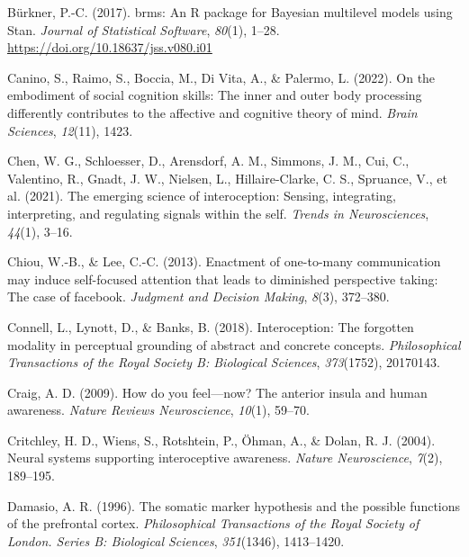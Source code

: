 \documentclass[
  man,mask,floatsintext]{apa6}
\newlength{\cslhangindent}
\newlength{\cslentryspacingunit} %
\newenvironment{CSLReferences}[2] %
 {%
  \setlength{\parindent}{0pt}
  \ifodd #1
  \let\oldpar\par
  \def\par{\hangindent=\cslhangindent\oldpar}
  \fi
  \setlength{\parskip}{#2\cslentryspacingunit}
 }%
 {}
\begin{document}
\begin{CSLReferences}{1}{0}
\leavevmode{}%
Bürkner, P.-C. (2017). {brms}: An {R} package for {Bayesian} multilevel models using {Stan}. \emph{Journal of Statistical Software}, \emph{80}(1), 1--28. \url{https://doi.org/10.18637/jss.v080.i01}

\leavevmode{}%
Canino, S., Raimo, S., Boccia, M., Di Vita, A., \& Palermo, L. (2022). On the embodiment of social cognition skills: The inner and outer body processing differently contributes to the affective and cognitive theory of mind. \emph{Brain Sciences}, \emph{12}(11), 1423.

\leavevmode{}%
Chen, W. G., Schloesser, D., Arensdorf, A. M., Simmons, J. M., Cui, C., Valentino, R., Gnadt, J. W., Nielsen, L., Hillaire-Clarke, C. S., Spruance, V., et al. (2021). The emerging science of interoception: Sensing, integrating, interpreting, and regulating signals within the self. \emph{Trends in Neurosciences}, \emph{44}(1), 3--16.

\leavevmode{}%
Chiou, W.-B., \& Lee, C.-C. (2013). Enactment of one-to-many communication may induce self-focused attention that leads to diminished perspective taking: The case of facebook. \emph{Judgment and Decision Making}, \emph{8}(3), 372--380.

\leavevmode{}%
Connell, L., Lynott, D., \& Banks, B. (2018). Interoception: The forgotten modality in perceptual grounding of abstract and concrete concepts. \emph{Philosophical Transactions of the Royal Society B: Biological Sciences}, \emph{373}(1752), 20170143.

\leavevmode{}%
Craig, A. D. (2009). How do you feel---now? The anterior insula and human awareness. \emph{Nature Reviews Neuroscience}, \emph{10}(1), 59--70.

\leavevmode{}%
Critchley, H. D., Wiens, S., Rotshtein, P., Öhman, A., \& Dolan, R. J. (2004). Neural systems supporting interoceptive awareness. \emph{Nature Neuroscience}, \emph{7}(2), 189--195.

\leavevmode{}%
Damasio, A. R. (1996). The somatic marker hypothesis and the possible functions of the prefrontal cortex. \emph{Philosophical Transactions of the Royal Society of London. Series B: Biological Sciences}, \emph{351}(1346), 1413--1420.


\end{CSLReferences}
\end{document}
